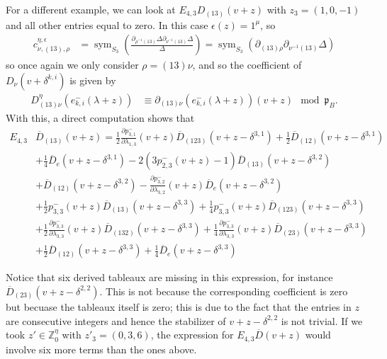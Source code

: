 \documentclass[11pt,fleqn]{article}
\newcommand\ZZ{\mathbb Z}
\newcommand\D{\overline D}
\newcommand\p{\mathfrak p}
\DeclareMathOperator\sym{sym}
\begin{document}
For a different example, we can look at $E_{4,3} D_{(13)}(v+z)$ with $z_3 = 
(1,0,-1)$ and all other entries equal to zero. In this case $\epsilon(z) = 
1^\mu$, so
\begin{align*}
c_{\nu,(13),\rho}^{\eta,\epsilon} 
  &= \sym_{S_3} \left( \frac{
    \partial_{\rho^{-1}(13)}\Delta \partial_{\nu^{-1}(13)} \Delta}{\Delta}
    \right) = \sym_{S_3}(\partial_{(13)\rho}\partial_{\nu^{-1}(13)} \Delta)
\end{align*}
so once again we only consider $\rho = (13)\nu$, and so the coefficient of
$D_{\nu}(v+\delta^{k,i})$ is given by
\begin{align*}
D_{(13)\nu}^\eta(e^-_{k,i}(\lambda + z)) 
  &\equiv \partial_{(13)\nu}(e^-_{k,i}(\lambda + z))(v+z) \mod \p_B.
\end{align*}
With this, a direct computation shows that
\begin{align*}
E_{4,3} &\D_{(13)}(v+z)
  = \frac{1}{2} \frac{\partial p_{3,1}^-}{\partial \lambda_{1,3}}(v+z)
    \D_{(123)}(v+z-\delta^{3,1}) + \frac{1}{2} \D_{(12)}(v+z-\delta^{3,1})\\
    &+ \frac{1}{4} \D_{e} (v+z-\delta^{3,1}) -2 \left( 3 p^-_{2,3}(v+z) - 
    1\right) \D_{(13)}(v+z-\delta^{3,2})\\
    &+ \D_{(12)}(v+z-\delta^{3,2}) - 
    \frac{\partial p_{3,2}^-}{\partial\lambda_{3,2}}(v+z) \D_e(v+z-
    \delta^{3,2})\\
    &+ \frac{1}{2}p_{3,3}^-(v+z) \D_{(13)}(v+z-\delta^{3,3}) 
    + \frac{1}{4}p_{3,3}^-(v+z) \D_{(123)}(v+z-\delta^{3,3})  \\
    &+ \frac{1}{2}\frac{\partial p_{3,3}^-}{\partial \lambda_{3,3}}(v+z) 
      \D_{(132)}(v+z-\delta^{3,3}) + \frac{1}{4}
      \frac{\partial p_{3,3}^-}{\partial \lambda_{3,3}}(v+z) 
      \D_{(23)}(v+z-\delta^{3,3}) \\
    &+ \frac{1}{2}\D_{(12)}(v+z-\delta^{3,3}) + \frac{1}{4}
    \D_{e}(v+z-\delta^{3,3})
\end{align*}

Notice that six derived tableaux are missing in this expression, for 
instance $\D_{(23)}(v+z-\delta^{2,2})$. This is not because the corresponding
coefficient is zero but becuase the tableaux itself is zero; this is due to 
the fact that the entries in $z$ are consecutive integers and hence the 
stabilizer of $v+z-\delta^{2,2}$ is not trivial. If we took 
$z' \in \ZZ^\eta_0$ with $z'_3 = (0, 3, 6)$, the expression for $E_{4,3} 
\D(v+z)$ would involve six more terms than the ones above.
\begin{bibdiv}
\begin{biblist}
\end{biblist}
\end{bibdiv}
\end{document}
